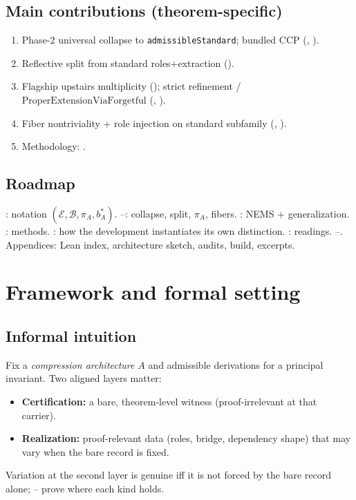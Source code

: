 \documentclass[11pt]{article}
\begin{document}
\subsection{Main contributions (theorem-specific)}\label{sec:intro-contributions}
\begin{enumerate}
    \item Phase-2 universal collapse to \texttt{admissibleStandard}; bundled CCP (, ).
    \item Reflective split from standard roles+extraction ().
    \item Flagship upstairs multiplicity (); strict refinement / $\mathrm{ProperExtensionViaForgetful}$ (, ).
    \item Fiber nontriviality + role injection on standard subfamily (, ).
    \item Methodology: .
\end{enumerate}

\subsection{Roadmap}\label{sec:intro-roadmap}
: notation $(\mathcal{E},\mathcal{B},\pi_A,b^\ast_A)$. --: collapse, split, $\pi_A$, fibers. : NEMS + generalization. : methods. : how the development instantiates its own distinction. : readings. --. Appendices: Lean index, architecture sketch, audits, build, excerpts.

\section{Framework and formal setting}\label{sec:framework}

\subsection{Informal intuition}\label{sec:framework-intuition}
Fix a \emph{compression architecture} $A$ and admissible derivations for a principal invariant. Two aligned layers matter:
\begin{itemize}
    \item \textbf{Certification:} a bare, theorem-level witness (proof-irrelevant at that carrier).
    \item \textbf{Realization:} proof-relevant data (roles, bridge, dependency shape) that may vary when the bare record is fixed.
\end{itemize}
Variation at the second layer is genuine iff it is not forced by the bare record alone; -- prove where each kind holds.
\end{document}
